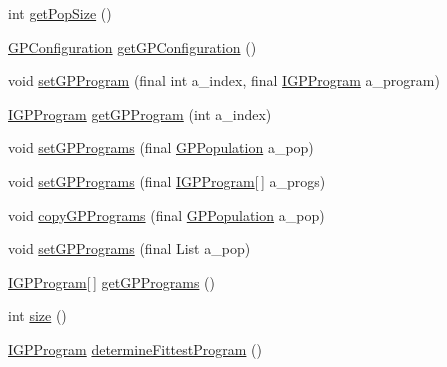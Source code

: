 \begin{DoxyCompactItemize}
\item 
int \hyperlink{classorg_1_1jgap_1_1gp_1_1impl_1_1_g_p_population_a22d30c1d8d7bf5e1340fb6bf6bf36af5}{get\-Pop\-Size} ()
\item 
\hyperlink{classorg_1_1jgap_1_1gp_1_1impl_1_1_g_p_configuration}{G\-P\-Configuration} \hyperlink{classorg_1_1jgap_1_1gp_1_1impl_1_1_g_p_population_a6c4ab9ac1358c54cce879696e56376df}{get\-G\-P\-Configuration} ()
\item 
void \hyperlink{classorg_1_1jgap_1_1gp_1_1impl_1_1_g_p_population_a11dce280ef2ec6ff8a7e1078500feda0}{set\-G\-P\-Program} (final int a\-\_\-index, final \hyperlink{interfaceorg_1_1jgap_1_1gp_1_1_i_g_p_program}{I\-G\-P\-Program} a\-\_\-program)
\item 
\hyperlink{interfaceorg_1_1jgap_1_1gp_1_1_i_g_p_program}{I\-G\-P\-Program} \hyperlink{classorg_1_1jgap_1_1gp_1_1impl_1_1_g_p_population_a85692cb78096a06ba3446f4847d0fd1e}{get\-G\-P\-Program} (int a\-\_\-index)
\item 
void \hyperlink{classorg_1_1jgap_1_1gp_1_1impl_1_1_g_p_population_a2e36a0da99ef591a5980b0f1eef83b31}{set\-G\-P\-Programs} (final \hyperlink{classorg_1_1jgap_1_1gp_1_1impl_1_1_g_p_population}{G\-P\-Population} a\-\_\-pop)
\item 
void \hyperlink{classorg_1_1jgap_1_1gp_1_1impl_1_1_g_p_population_a8d9d5bb131077ec72be3a0137716775e}{set\-G\-P\-Programs} (final \hyperlink{interfaceorg_1_1jgap_1_1gp_1_1_i_g_p_program}{I\-G\-P\-Program}\mbox{[}$\,$\mbox{]} a\-\_\-progs)
\item 
void \hyperlink{classorg_1_1jgap_1_1gp_1_1impl_1_1_g_p_population_a81449bc4b63442f9296c2f65508a155a}{copy\-G\-P\-Programs} (final \hyperlink{classorg_1_1jgap_1_1gp_1_1impl_1_1_g_p_population}{G\-P\-Population} a\-\_\-pop)
\item 
void \hyperlink{classorg_1_1jgap_1_1gp_1_1impl_1_1_g_p_population_a45a7caf3ae473c7f75979a76526cb67a}{set\-G\-P\-Programs} (final List a\-\_\-pop)
\item 
\hyperlink{interfaceorg_1_1jgap_1_1gp_1_1_i_g_p_program}{I\-G\-P\-Program}\mbox{[}$\,$\mbox{]} \hyperlink{classorg_1_1jgap_1_1gp_1_1impl_1_1_g_p_population_a6e608302ac1da22597e9b5dbc2c0faae}{get\-G\-P\-Programs} ()
\item 
int \hyperlink{classorg_1_1jgap_1_1gp_1_1impl_1_1_g_p_population_a73feb5c387bfb23ae12620126e392ebc}{size} ()
\item 
\hyperlink{interfaceorg_1_1jgap_1_1gp_1_1_i_g_p_program}{I\-G\-P\-Program} \hyperlink{classorg_1_1jgap_1_1gp_1_1impl_1_1_g_p_population_a6daa11823812dd94682ae3a590dd38f1}{determine\-Fittest\-Program} ()

\end{DoxyCompactItemize}
